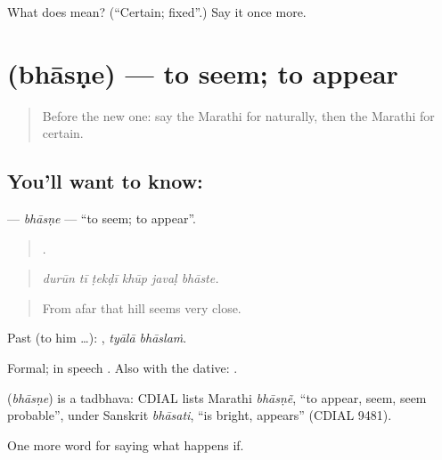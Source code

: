 \begin{tcolorbox}[breakable,colback=teal!4,colframe=teal!35!black,title={Before you move on}]
What does  mean? (\textquotedblleft{}Certain; fixed\textquotedblright{}.) Say it once more.
\end{tcolorbox}
\section[\texorpdfstring{\mr{भासणे} (bhāsṇe)}{भासणे (bhāsṇe)}]{ (bhāsṇe) — to seem; to appear}

\label{lesson:MR-C382-bhasne}



\begin{quote}
Before the new one: say the Marathi for naturally, then the Marathi for certain.
\end{quote}

\subsection*{You'll want to know: }
\textbf{} — \emph{bhāsṇe} — \textquotedblleft{}to seem; to appear\textquotedblright{}.

\begin{quote}
     .
\end{quote}

\begin{quote}
\emph{durūn tī ṭekḍī khūp javaḷ bhāste.}
\end{quote}

\begin{quote}
From afar that hill seems very close.
\end{quote}

Past (to him …):  , \emph{tyālā bhāslaṁ}.

Formal; in speech . Also with the dative:   .

\begin{cousinweb}
\textbf{} (\emph{bhāsṇe}) is a tadbhava: CDIAL lists Marathi \emph{bhāsṇẽ}, \textquotedblleft{}to appear, seem, seem probable\textquotedblright{}, under Sanskrit \emph{bhāsati}, \textquotedblleft{}is bright, appears\textquotedblright{} (CDIAL 9481).
\end{cousinweb}

\begin{grammarlens}[title={What you've built}]
One more word for saying what happens if.
\end{grammarlens}

